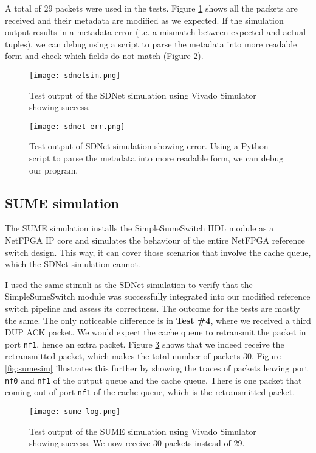 A total of 29 packets were used in the tests. Figure \ref{fig:sdnetsim} shows all the packets are received and their metadata are modified as we expected. If the simulation output results in a metadata error (i.e. a mismatch between expected and actual tuples), we can debug using a script to parse the metadata into more readable form and check which fields do not match (Figure \ref{fig:sdnet-err}).

\begin{figure}[!h]
	\centering
	\texttt{[image: sdnetsim.png]}
	\caption{Test output of the SDNet simulation using Vivado Simulator showing success.}
	\label{fig:sdnetsim}
\end{figure}

\begin{figure}[!h]
	\centering
	\texttt{[image: sdnet-err.png]}
	\caption{Test output of SDNet simulation showing error. Using a Python script to parse the metadata into more readable form, we can debug our program.}
	\label{fig:sdnet-err}
\end{figure}

\subsection{SUME simulation}
The SUME simulation installs the SimpleSumeSwitch HDL module as a NetFPGA IP core and simulates the behaviour of the entire NetFPGA reference switch design. This way, it can cover those scenarios that involve the cache queue, which the SDNet simulation cannot. 

I used the same stimuli as the SDNet simulation to verify that the SimpleSumeSwitch module was successfully integrated into our modified reference switch pipeline and assess its correctness. The 
outcome for the tests are mostly the same. The only noticeable difference is in \textbf{Test \#4}, where we received a third DUP ACK packet. We would expect the cache queue to retransmit the packet in port \verb|nf1|, hence an extra packet. Figure \ref{fig:sumelog} shows that we indeed receive the retransmitted packet, which makes the total number of packets 30. Figure \ref{fig:sumesim} illustrates this further by showing the traces of packets leaving port \verb|nf0| and \verb|nf1| of the output queue and the cache queue. There is one packet that coming out of port \verb|nf1| of the cache queue, which is the retransmitted packet.

\begin{figure}[!h]
	\centering
	\texttt{[image: sume-log.png]}
	\caption{Test output of the SUME simulation using Vivado Simulator showing success. We now receive 30 packets instead of 29.}
	\label{fig:sumelog}
\end{figure}

